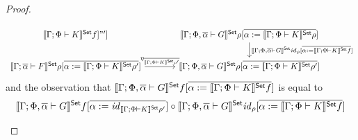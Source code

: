 \documentclass[acmsmall,review,anonymous]{acmart}
\theoremstyle{definition}
\renewcommand{\id}{\mathit{id}}
\begin{document}
\begin{proof}
\begin{itemize}
{\[\begin{tikzcd}[column sep = large]
{{        \setsem{\Gamma;\Phi \vdash K}f}]}"']
& \setsem{\Gamma;
  \Phi,\ol{\alpha} \vdash G}\rho[\ol{\alpha := \setsem{\Gamma;\Phi \vdash
      K}\rho}]
\ar[d, "{\setsem{\Gamma; \Phi,\ol{\alpha} \vdash G} \id_{\rho} [\ol{\alpha := 
        \setsem{\Gamma;\Phi \vdash K}f}]}"]\\
\setsem{\Gamma; \ol{\alpha} \vdash F}\rho[\ol{\alpha :=
    \setsem{\Gamma;\Phi \vdash K}\rho'}] \ar[r,
  "{\eta_{\ol{\setsem{\Gamma;\Phi \vdash K}\rho'}} }"]
& \setsem{\Gamma; \Phi,\ol{\alpha} \vdash G}\rho[\ol{\alpha :=
    \setsem{\Gamma;\Phi \vdash K}\rho'}]
\end{tikzcd}\]}
and the observation that
$\llbracket{\Gamma;\Phi, \overline{\alpha} \vdash G}\rrbracket^{\mathsf{Set}} f[\overline{\alpha := \llbracket{\Gamma;\Phi\vdash K}\rrbracket^{\mathsf{Set}} f }]$
is equal to
\[
\setsem{\Gamma;\Phi, \ol{\alpha} \vdash G} f[\overline{\alpha := \id_{\setsem{\Gamma;\Phi\vdash K}\rho'}}]
\circ \setsem{\Gamma;\Phi, \ol{\alpha} \vdash G} \id_{\rho} [\overline{\alpha := \setsem{\Gamma;\Phi\vdash K}f}]
\]


\end{itemize}
\end{proof}
\end{document}

